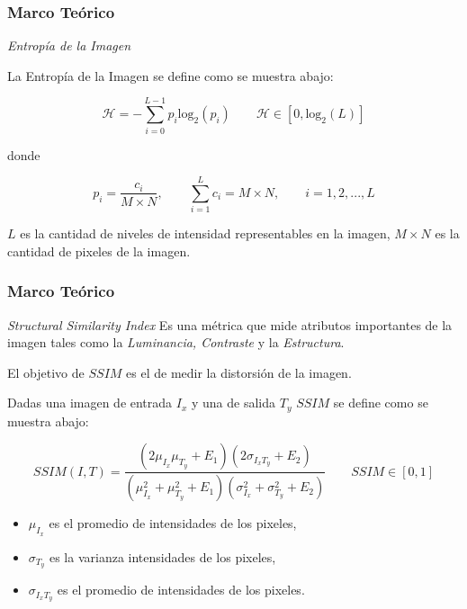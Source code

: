 \documentclass[usenames,dvipsnames]{beamer}
\begin{document}
\begin{frame} 
\frametitle{Marco Teórico} 
\begin{exampleblock}{\textit{Entropía de la Imagen}}

La Entropía de la Imagen se define como se muestra abajo:

\end{exampleblock}

\begin{equation}
\mathscr{H}= -\sum_{i=0}^{L-1} p_i \text{log}_2(p_i) \qquad \mathscr{H} \in [0,\text{log}_2(L)]
\end{equation}

donde

\begin{equation}
p_i=\frac{c_i}{M \times N}, \qquad \sum_{i=1}^L c_i = M \times N, \qquad i= 1,2, ..., L
\end{equation}

$L$ es la cantidad de niveles de intensidad representables en la imagen, $M \times N$ es la cantidad de pixeles de la imagen.

\end{frame}    

\begin{frame} 

\frametitle{Marco Teórico} 
\begin{exampleblock}{\textit{Structural Similarity Index}}
Es una métrica que mide atributos importantes de la imagen tales como la \textit{Luminancia, Contraste} y la \textit{Estructura}.

El objetivo de $SSIM$ es el de medir la distorsión de la imagen.

Dadas una imagen de entrada $I_x$ y una de salida $T_y$ $SSIM$ se define como se muestra abajo:

\end{exampleblock}
\vspace{-0.5cm}
\begin{equation}
SSIM(I,T) = \frac{(2\mu_{I_x} \mu_{T_y}+E_1)(2\sigma_{I_xT_y}+E_2)}{(\mu^2_{I_x}+\mu^2_{T_y}+E_1)(\sigma^2_{I_x} + \sigma^2_{T_y}+E_2)} \qquad SSIM \in [0,1]
\end{equation}

\begin{itemize}
	\item $\mu_{I_x}$ es el promedio de intensidades de los pixeles,
	\item $\sigma_{T_y}$ es la varianza intensidades de los pixeles,
	\item $\sigma_{I_xT_y}$ es el promedio de intensidades de los pixeles.
\end{itemize}

\end{frame}  
\end{document}
